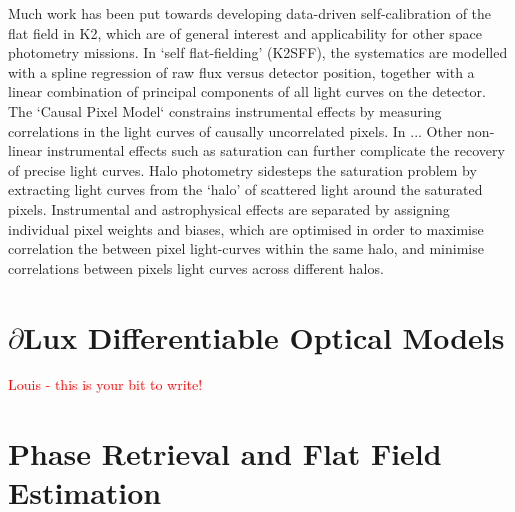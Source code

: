 \documentclass[twocolumn]{spie}
\newcommand\dlux{$\partial$Lux\xspace}
\begin{document}
Much work has been put towards developing data-driven self-calibration of the flat field in K2, which are of general interest and applicability for other space photometry missions. 
In  `self flat-fielding' (K2SFF\cite{self_flat-fielding}), the systematics are modelled with a spline regression of raw flux versus detector position, together with a linear combination of principal components of all light curves on the detector. 
The `Causal Pixel Model` \cite{causal_pixel} constrains instrumental effects by measuring correlations in the light curves of causally uncorrelated pixels.
In \cite{pixel_decorr} ... 
Other non-linear instrumental effects such as saturation can further complicate the recovery of precise light curves. Halo photometry \cite{halo, halo2} sidesteps the saturation problem by extracting light curves from the `halo' of scattered light around the saturated pixels. Instrumental and astrophysical effects are separated by assigning individual pixel weights and biases, which are optimised in order to maximise correlation the between pixel light-curves within the same halo, and minimise correlations between pixels light curves across different halos.



\section{\dlux Differentiable Optical Models}
\label{sec:dlux}
\textcolor{red}{Louis - this is your bit to write!}



\section{Phase Retrieval and Flat Field Estimation}
\label{sec:phaseretrieval}
\end{document}

